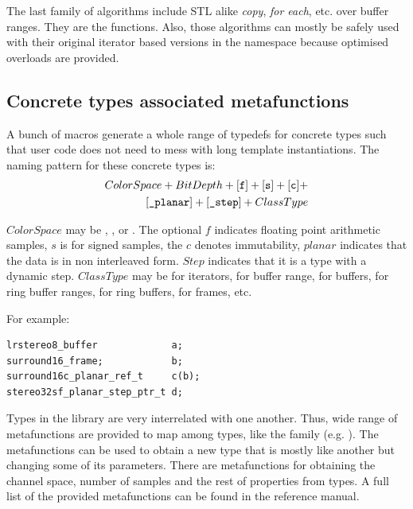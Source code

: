 The last family of algorithms include STL alike \emph{copy}, \emph{for
each}, etc. over buffer ranges. They are the 
functions. Also, those algorithms can mostly be safely used with their
original iterator based versions in the  namespace because
optimised overloads are provided.

\subsection{Concrete types associated metafunctions}

A bunch of macros generate a whole range of typedefs for concrete
types such that user code does not need to mess with long template
instantiations. The naming pattern for these concrete types is:
\begin{equation}
\begin{aligned}
ColorSpace+BitDepth+[\mbox{\tt f}]+[\mbox{\tt s}]+[\mbox{\tt c}]+&\\
[\mbox{\tt \_planar}] + [\mbox{\tt\_step}] + ClassType&
\end{aligned}
\end{equation}

$ColorSpace$ may be , ,  or
. The optional $f$ indicates floating point arithmetic
samples, $s$ is for signed samples, the $c$ denotes immutability,
$planar$ indicates that the data is in non interleaved form. $Step$
indicates that it is a type with a dynamic step. $ClassType$ may be
 for iterators,  for buffer range, 
for buffers,  for ring buffer ranges,
 for ring buffers,  for frames, etc.

For example:
\begin{lstlisting}
lrstereo8_buffer             a;
surround16_frame;            b;
surround16c_planar_ref_t     c(b);
stereo32sf_planar_step_ptr_t d;
\end{lstlisting}

Types in the library are very interrelated with one another. Thus,
wide range of metafunctions are provided to map among types, like the
 family (e.g. ). The
 metafunctions can be used to obtain a new type
that is mostly like another but changing some of its parameters. There
are metafunctions for obtaining the channel space, number of samples
and the rest of properties from types. A full list of the provided
metafunctions can be found in the reference manual.

